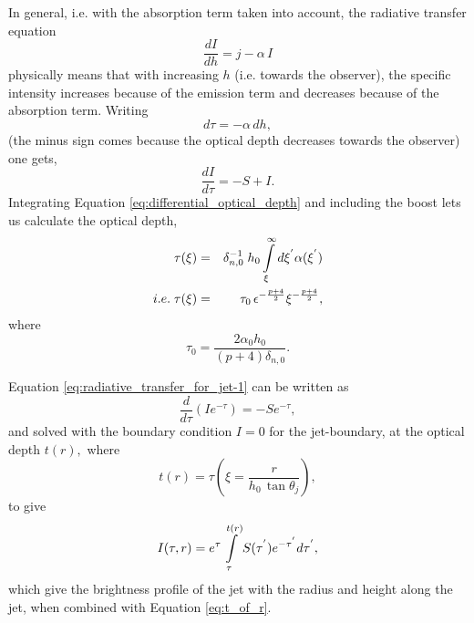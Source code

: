In general, i.e. with the absorption term taken into account, the radiative transfer equation
\begin{equation}
\dfrac{dI}{dh} = j - \alpha \, I \label{eq:full_radiative_transfer_jet}
\end{equation}
physically means that with increasing $ h $ (i.e. towards the observer), the specific intensity increases because of the emission term and decreases because of the absorption term. Writing
\begin{equation}
d \tau = - \alpha \, dh , \label{eq:differential_optical_depth}
\end{equation}
(the minus sign comes because the optical depth decreases towards the observer)
one gets,
\begin{equation}
\dfrac{dI}{d\tau} = - S + I. \label{eq:radiative_transfer_for_jet-1}
\end{equation}
Integrating Equation \ref{eq:differential_optical_depth} and including the boost lets us calculate the optical depth,
\begin{eqnarray}
\tau( \xi ) & = & \delta_{n,0}^{-1} \; h_0 \intop_{\xi}^{\infty} d \xi^{'} \alpha(\xi^{'}) \nonumber \\
i.e. \; \tau( \xi ) & = & \tau_0 \, \epsilon^{- \frac{p+4}{2} } \xi^{- \frac{p+4}{2} } , \label{eq:tau_on_axis}
\end{eqnarray}
where
\begin{equation}
\tau_0 = \dfrac{2 \alpha_0 h_0 }{(p+4) \delta_{n,0}}. \label{eq:tau_zero}
\end{equation}


Equation \ref{eq:radiative_transfer_for_jet-1} can be written as
\begin{equation}
\dfrac{d}{d \tau}(I e^{- \tau}) = - S e^{- \tau}, \label{eq:radiative_transfer_equation_for_jet-2}
\end{equation}
and solved with the boundary condition $ I = 0 $ for the jet-boundary, at the optical depth $ t(r), $ where
\begin{equation}
t(r) = \tau( \xi = \dfrac{r}{h_0 \, \tan \theta_j } ), \label{eq:t_of_r}
\end{equation} 
to give
\begin{equation}
I(\tau, r) = e^{\tau} \intop_{\tau}^{t(r)} S(\tau^{'}) e^{- \tau^{'}} d \tau^{'}, \label{eq:brightness_profile_of_jet}
\end{equation}
which give the brightness profile of the jet with the radius and height along the jet, when combined with Equation \ref{eq:t_of_r}.

